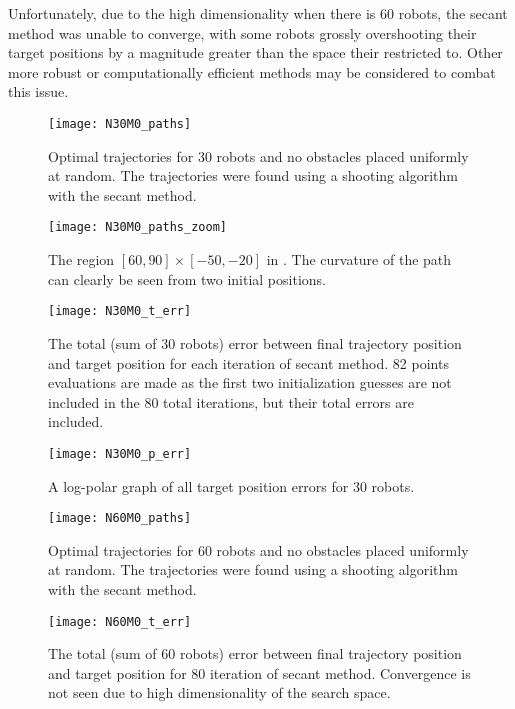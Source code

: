 \documentclass[11pt]{article}
\begin{document}
Unfortunately, due to the high dimensionality when there is 60 robots, the secant method was unable to converge, with some robots grossly overshooting their target positions by a magnitude greater than the space their restricted to. Other more robust or computationally efficient methods may be considered to combat this issue.

\begin{figure}
	\centering
	\texttt{[image: N30M0\_paths]}
	\caption{Optimal trajectories for 30 robots and no obstacles placed uniformly at random. The trajectories were found using a shooting algorithm with the secant method.}
	\label{fig:n30m0-paths}
\end{figure}

\begin{figure}
	\centering
	\texttt{[image: N30M0\_paths\_zoom]}
	\caption{The region \([60,90] \times [-50,-20]\) in . The curvature of the path can clearly be seen from two initial positions.}
	\label{fig:n30m0-paths-zoom}
\end{figure}

\begin{figure}
	\centering
	\texttt{[image: N30M0\_t\_err]}
	\caption{The total (sum of 30 robots) error between final trajectory position and target position for each iteration of secant method. 82 points evaluations are made as the first two initialization guesses are not included in the 80 total iterations, but their total errors are included.}
	\label{fig:n30m0-t-err}
\end{figure}

\begin{figure}
	\centering
	\texttt{[image: N30M0\_p\_err]}
	\caption{A log-polar graph of all target position errors for 30 robots.}
	\label{fig:n30m0-p-err}
\end{figure}

\begin{figure}
	\centering
	\texttt{[image: N60M0\_paths]}
	\caption{Optimal trajectories for 60 robots and no obstacles placed uniformly at random. The trajectories were found using a shooting algorithm with the secant method.}
	\label{fig:n60m0-paths}
\end{figure}

\begin{figure}
	\centering
	\texttt{[image: N60M0\_t\_err]}
	\caption{The total (sum of 60 robots) error between final trajectory position and target position for 80 iteration of secant method. Convergence is not seen due to high dimensionality of the search space.}
	\label{fig:n60m0-t-err}
\end{figure}
\end{document}
